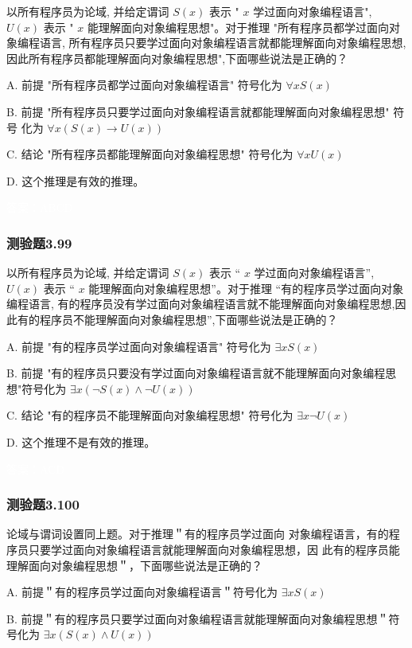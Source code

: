 \documentclass[UTF8, heading=true]{ctexart}
\begin{document}
以所有程序员为论域, 并给定谓词 $S(x)$ 表示 " $x$ 学过面向对象编程语言", $U(x)$ 表示 " $x$ 能理解面向对象编程思想"。对于推理 "所有程序员都学过面向对象编程语言, 所有程序员只要学过面向对象编程语言就都能理解面向对象编程思想,因此所有程序员都能理解面向对象编程思想",下面哪些说法是正确的？

A. 前提 "所有程序员都学过面向对象编程语言" 符号化为 $\forall x S(x)$

B.  前提 "所有程序员只要学过面向对象编程语言就都能理解面向对象编程思想" 符号
化为 $\forall x(S(x) \rightarrow U(x))$

C. 结论 "所有程序员都能理解面向对象编程思想" 符号化为 $\forall x U(x)$

D. 这个推理是有效的推理。

\textcolor{white}{答案：ABCD}

\subsubsection{测验题3.99}

以所有程序员为论域, 并给定谓词 $S(x)$ 表示 “ $x$ 学过面向对象编程语言”, $U(x)$ 表示 “ $x$ 能理解面向对象编程思想”。对于推理 “有的程序员学过面向对象编程语言, 有的程序员没有学过面向对象编程语言就不能理解面向对象编程思想,因此有的程序员不能理解面向对象编程思想”,下面哪些说法是正确的？

A. 前提 "有的程序员学过面向对象编程语言" 符号化为 $\exists x S(x)$

B.
前提 "有的程序员只要没有学过面向对象编程语言就不能理解面向对象编程思想"符号化为 $\exists x(\neg S(x) \wedge \neg U(x))$

C. 结论 "有的程序员不能理解面向对象编程思想" 符号化为 $\exists x \neg U(x)$

D. 这个推理不是有效的推理。

\textcolor{white}{答案：ACD}

\subsubsection{测验题3.100}

论域与谓词设置同上题。对于推理＂有的程序员学过面向
对象编程语言，有的程序员只要学过面向对象编程语言就能理解面向对象编程思想，因
此有的程序员能理解面向对象编程思想＂，下面哪些说法是正确的？

A. 前提＂有的程序员学过面向对象编程语言＂符号化为 $\exists x S(x)$

B. 前提＂有的程序员只要学过面向对象编程语言就能理解面向对象编程思想＂符号化为 $\exists x(S(x) \wedge U(x))$
\end{document}
